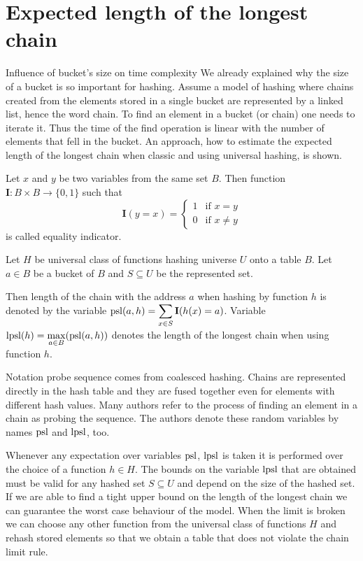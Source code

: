 \chapter{Expected length of the longest chain}

\begin{section}{Influence of bucket's size on time complexity}
We already explained why the size of a bucket is so important for hashing. Assume a model of hashing where chains created from the elements stored in a single bucket are represented by a linked list, hence the word chain. To find an element in a bucket (or chain) one needs to iterate it. Thus the time of the find operation is linear with the number of elements that fell in the bucket. An approach, how to estimate the expected length of the longest chain when classic and using universal hashing, is shown.

\begin{definition}
Let $x$ and $y$ be two variables from the same set $B$. Then function $\mathbf{I}: B \times B \rightarrow \{0, 1\}$ such that
\[
 \mathbf{I}(y = x) =
  \begin{cases}
   1 & \text{if } x = y \\
   0 & \text{if } x \neq y
  \end{cases}
\]
is called equality indicator.
\end{definition}

\begin{definition}
Let $H$ be universal class of functions hashing universe $U$ onto a table $B$. Let $a \in B$ be a bucket of $B$ and $S \subseteq U$ be the represented set. 

Then length of the chain with the address $a$ when hashing by function $h$ is denoted by the variable $\mathrm{psl}(a, h) = \displaystyle \sum_{x \in S} \mathbf{I}(h(x) = a)$. Variable $\mathrm{lpsl}(h) = \displaystyle \max_{a \in B} (\mathrm{psl}(a, h))$ denotes the length of the longest chain when using function $h$.
\end{definition}

Notation probe sequence comes from coalesced hashing. Chains are represented directly in the hash table and they are fused together even for elements with different hash values. Many authors refer to the process of finding an element in a chain as probing the sequence. The authors denote these random variables by names $\mathrm{psl}$ and $\mathrm{lpsl}$, too. %

Whenever any expectation over variables $\mathrm{psl}$, $\mathrm{lpsl}$ is taken it is performed over the choice of a function $h \in H$. The bounds on the variable $\mathrm{lpsl}$ that are obtained must be valid for any hashed set $S \subseteq U$ and depend on the size of the hashed set. If we are able to find a tight upper bound on the length of the longest chain we can guarantee the worst case behaviour of the model. When the limit is broken we can choose any other function from the universal class of functions $H$ and rehash stored elements so that we obtain a table that does not violate the chain limit rule.


\end{section}

